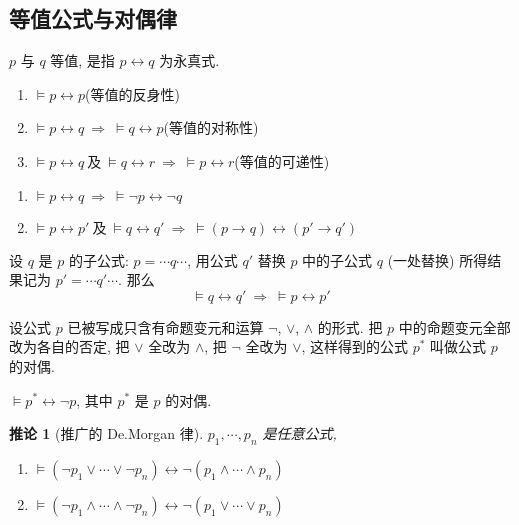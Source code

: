 \documentclass[
    color=black,
    device=normal,
    lang=cn
]{elegantnote}
\newtheorem{deduction}{推论}[section]
\begin{document}
\subsection{等值公式与对偶律}
\begin{definition}[等值公式]
    $p$ 与 $q$ 等值, 是指 $p\leftrightarrow q$ 为永真式.
\end{definition}
\begin{proposition}
    \hfill
    \begin{enumerate}[label = $\arabic*^\circ$, topsep = -1em]
        \item $\vDash p \leftrightarrow p$\hfill (等值的反身性)
        \item $\vDash p \leftrightarrow q \ \Rightarrow\ \vDash q\leftrightarrow p$\hfill (等值的对称性)
        \item $\vDash p \leftrightarrow q\ \text{及}\ \vDash q \leftrightarrow r\ \Rightarrow\ \vDash p \leftrightarrow r$\hfill (等值的可递性)
    \end{enumerate}
\end{proposition}
\begin{proposition}
    \hfill
    \begin{enumerate}[label = $\arabic*^\circ$, topsep = -1em]
        \item $\vDash p\leftrightarrow q\ \Rightarrow\ \vDash\lnot p\leftrightarrow \lnot q$
        \item $\vDash p\leftrightarrow p'\ \text{及}\ \vDash q\leftrightarrow q'\ \Rightarrow\ \vDash(p\to q)\leftrightarrow(p'\to q')$
    \end{enumerate}
\end{proposition}
\begin{theorem}[子公式等值可替换性]
    设 $q$ 是 $p$ 的子公式: $p=\cdots q\cdots$, 用公式 $q'$ 替换 $p$ 中的子公式 $q$ (一处替换) 所得结果记为 $p'=\cdots q'\cdots$. 那么
    $$
        \vDash q\leftrightarrow q'\ \Rightarrow\ \vDash p\leftrightarrow p'
    $$
\end{theorem}
\begin{definition}[公式的对偶]
    设公式 $p$ 已被写成只含有命题变元和运算 $\lnot$, $\lor$, $\land$ 的形式. 把 $p$ 中的命题变元全部改为各自的否定, 把 $\lor$ 全改为 $\land$, 把 $\lnot$ 全改为 $\lor$, 这样得到的公式 $p^*$ 叫做公式 $p$ 的对偶.
\end{definition}
\begin{theorem}[对偶律]
    $\vDash p^*\leftrightarrow \lnot p$, 其中 $p^*$ 是 $p$ 的对偶.
\end{theorem}
\begin{deduction}[推广的 De.Morgan 律]
    $p_1,\cdots,p_n$ 是任意公式,
    \begin{enumerate}[label = $\arabic*^\circ$, topsep = -1em]
        \item $\vDash (\lnot p_1\lor\cdots\lor\lnot p_n)\leftrightarrow\lnot (p_1\land\cdots\land p_n)$
        \item $\vDash (\lnot p_1\land\cdots\land\lnot p_n)\leftrightarrow\lnot (p_1\lor\cdots\lor p_n)$
    \end{enumerate}
\end{deduction}
\end{document}
